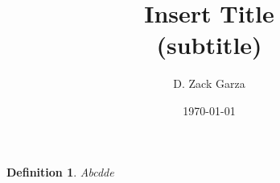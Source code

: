 \documentclass[11pt]{article}
\title{
	\textbf{Insert Title}\\ 
	{\normalsize (subtitle)}
}
\author{D. Zack Garza}
\date{\today}
\newtheorem{defn}{Definition}
\begin{document}
\maketitle

\begin{defn}
Abcdde\cite{	hatcherAlgebraicTopologya}
\end{defn}

 

\end{document}
